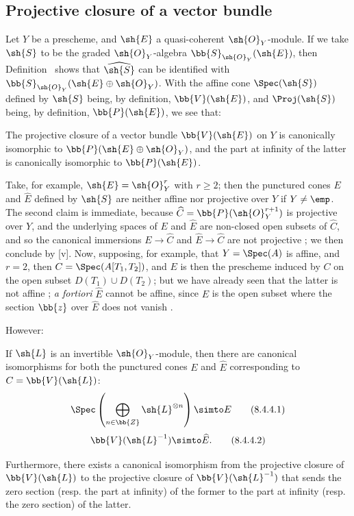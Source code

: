 \subsection{Projective closure of a vector bundle}
\label{subsection:II.8.4}

\begin{env}[8.4.1]
\label{II.8.4.1}
Let $Y$ be a prescheme, and $\sh{E}$ a quasi-coherent $\sh{O}_Y$-module.
If we take $\sh{S}$ to be the graded $\sh{O}_Y$-algebra $\bb{S}_{\sh{O}_Y}(\sh{E})$, then Definition~ shows that $\widehat{\sh{S}}$ can be identified with $\bb{S}_{\sh{O}_Y}(\sh{E}\oplus\sh{O}_Y)$.
With the affine cone $\Spec(\sh{S})$ defined by $\sh{S}$ being, by definition, $\bb{V}(\sh{E})$, and $\Proj(\sh{S})$ being, by definition, $\bb{P}(\sh{E})$, we see that:
\end{env}
\begin{proposition}[8.4.2]
\label{II.8.4.2}
The projective closure of a vector bundle $\bb{V}(\sh{E})$ on $Y$ is canonically isomorphic to $\bb{P}(\sh{E}\oplus\sh{O}_Y)$, and the part at infinity of the latter is canonically isomorphic to $\bb{P}(\sh{E})$.
\end{proposition}

\begin{remark}[8.4.3]
\label{II.8.4.3}
Take, for example, $\sh{E}=\sh{O}_Y^r$ with $r\geq2$;
then the punctured cones $E$ and $\widehat{E}$ defined by $\sh{S}$ are neither affine nor projective over $Y$ if $Y\neq\emp$.
The second claim is immediate, because $\widehat{C}=\bb{P}(\sh{O}_Y^{r+1})$ is projective over $Y$, and the underlying spaces of $E$ and $\widehat{E}$ are non-closed open subsets of $\widehat{C}$, and so the canonical immersions $E\to\widehat{C}$ and $\widehat{E}\to\widehat{C}$ are not projective ; we then conclude by [v].
Now, supposing, for example, that $Y=\Spec(A)$ is affine, and $r=2$, then $C=\Spec(A[T_1,T_2])$, and $E$ is then the prescheme induced by $C$ on the open subset $D(T_1)\cup D(T_2)$;
but we have already seen that the latter is not affine ;
\emph{a fortiori} $\widehat{E}$ cannot be affine, since $E$ is the open subset where the section $\bb{z}$ over $\widehat{E}$ does not vanish .

However:
\end{remark}
\begin{proposition}[8.4.4]
\label{II.8.4.4}
If $\sh{L}$ is an invertible $\sh{O}_Y$-module, then there are canonical isomorphisms for both the punctured cones $E$ and $\widehat{E}$ corresponding to $C=\bb{V}(\sh{L})$:
\[
\label{eq:2.8.4.4.1}
  \Spec\left(
    \bigoplus_{n\in\bb{Z}}\sh{L}^{\otimes n}
  \right)
  \simto
  E
\tag{8.4.4.1}
\]
\[
\label{eq:2.8.4.4.2}
  \bb{V}(\sh{L}^{-1})
  \simto
  \widehat{E}.
\tag{8.4.4.2}
\]

Furthermore, there exists a canonical isomorphism from the projective closure of $\bb{V}(\sh{L})$ to the projective closure of $\bb{V}(\sh{L}^{-1})$ that sends the zero section (resp. the part at infinity) of the former to the part at infinity (resp. the zero section) of the latter.
\end{proposition}

